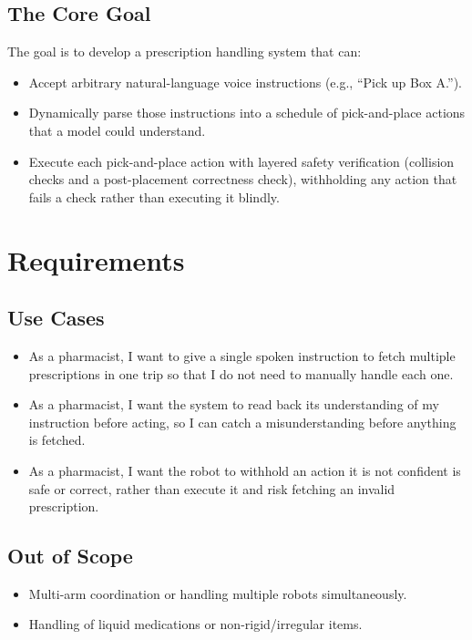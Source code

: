 \documentclass[12pt,a4paper]{article}
\begin{document}
\subsection{The Core Goal}
 
The goal is to develop a prescription handling system that can:
\begin{itemize}
  \item Accept arbitrary natural-language voice instructions (e.g., ``Pick up Box A.'').
  \item Dynamically parse those instructions into a schedule of pick-and-place actions that a model could understand.
  \item Execute each pick-and-place action with layered safety verification (collision checks and a post-placement correctness check), withholding any action that fails a check rather than executing it blindly.
\end{itemize}
\newpage
\section{Requirements}
 
\subsection*{Use Cases}
\begin{itemize}
  \item As a pharmacist, I want to give a single spoken instruction to fetch multiple prescriptions in one trip so that I do not need to manually handle each one.
  \item As a pharmacist, I want the system to read back its understanding of my instruction before acting, so I can catch a misunderstanding before anything is fetched.
  \item As a pharmacist, I want the robot to withhold an action it is not confident is safe or correct, rather than execute it and risk fetching an invalid prescription.
\end{itemize}
\subsection{Out of Scope}
\begin{itemize}
  \item Multi-arm coordination or handling multiple robots simultaneously.
  \item Handling of liquid medications or non-rigid/irregular items.
\end{itemize}
\end{document}
